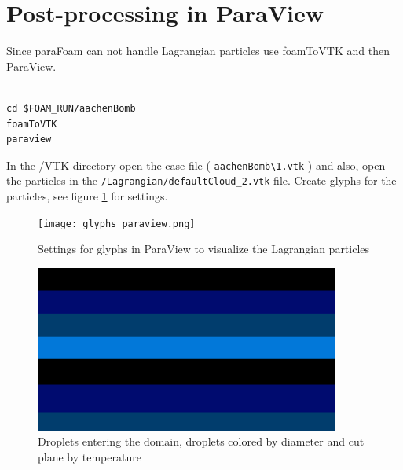 \documentclass{report}
\begin{document}
\section{Post-processing in ParaView}
\label{Post-processing in ParaView}
Since paraFoam can not handle Lagrangian particles use foamToVTK and then ParaView.
\begin{verbatim}

cd $FOAM_RUN/aachenBomb
foamToVTK  
paraview          	
\end{verbatim} 
In the /VTK directory open the case file ( \verb+aachenBomb\1.vtk+ ) and also, open the particles in the \verb+/Lagrangian/defaultCloud_2.vtk+ file.
Create glyphs for the particles, see figure \ref{Settings for glyphs in ParaView to visualize the Lagrangian particles} for settings.

\begin{figure}[h]
\begin{center}
\texttt{[image: glyphs\_paraview.png]}
\end{center}
\caption{Settings for glyphs in ParaView to visualize the Lagrangian particles}
\label{Settings for glyphs in ParaView to visualize the Lagrangian particles}
\end{figure}
\newpage


\begin{figure}[ht]
\begin{center}
\includegraphics[width=10cm]{drops_and_diamter_8.png}
\end{center}
\caption{Droplets entering the domain, droplets colored by diameter and cut plane by temperature}
\label{Droplets entering the domain, droplets colored by diameter and cut plane by temperature}
\end{figure}
\end{document}
